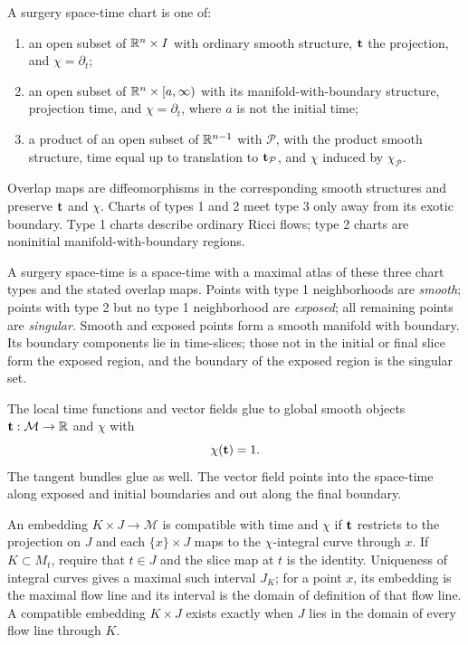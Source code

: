 A surgery space-time chart is one of:
\begin{enumerate}
\item an open subset of $\mathbb{R}^n\times I$ with ordinary smooth structure,
${\bf t}$ the projection, and $\chi=\partial_t$;
\item an open subset of $\mathbb{R}^n\times[a,\infty)$ with its manifold-with-boundary
structure, projection time, and $\chi=\partial_t$, where $a$ is not the initial
time;
\item a product of an open subset of $\mathbb{R}^{n-1}$ with ${\mathcal P}$, with the
product smooth structure, time equal up to translation to
${\bf t}_{\mathcal P}$, and $\chi$ induced by $\chi_{\mathcal P}$.
\end{enumerate}
Overlap maps are diffeomorphisms in the corresponding smooth structures and
preserve ${\bf t}$ and $\chi$. Charts of types 1 and 2 meet type 3 only away
from its exotic boundary. Type 1 charts describe ordinary Ricci flows; type 2
charts are noninitial manifold-with-boundary regions.

\begin{definition}
\label{def:surgery-space-time}

\label{spacetime}
A surgery space-time is a space-time with a maximal atlas of these three chart
types and the stated overlap maps. Points with type 1 neighborhoods are
\emph{smooth}; points with type 2 but no type 1 neighborhood are
\emph{exposed}; all remaining points are \emph{singular}. Smooth and exposed
points form a smooth manifold with boundary. Its boundary components lie in
time-slices; those not in the initial or final slice form the exposed region,
and the boundary of the exposed region is the singular set.

The local time functions and vector fields glue to global smooth objects
${\bf t}:{\mathcal M}\to\mathbb{R}$ and $\chi$ with
\[
  \chi({\bf t})=1.
\]
The tangent bundles glue as well. The vector field points into the space-time
along exposed and initial boundaries and out along the final boundary.
\end{definition}

\begin{definition}
\label{def:compatible-with-time-vector-field}

An embedding $K\times J\to{\mathcal M}$ is compatible with time and $\chi$ if
${\bf t}$ restricts to the projection on $J$ and each
$\{x\}\times J$ maps to the $\chi$-integral curve through $x$. If
$K\subset M_t$, require that $t\in J$ and the slice map at $t$ is the identity.
Uniqueness of integral curves gives a maximal such interval $J_K$; for a point
$x$, its embedding is the maximal flow line and its interval is the domain of
definition of that flow line. A compatible embedding $K\times J$ exists exactly
when $J$ lies in the domain of every flow line through $K$.
\end{definition}

